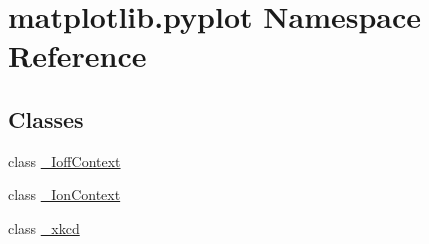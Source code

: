 \hypertarget{namespacematplotlib_1_1pyplot}{}\section{matplotlib.\+pyplot Namespace Reference}
\label{namespacematplotlib_1_1pyplot}
\subsection*{Classes}
\begin{DoxyCompactItemize}
\item 
class \hyperlink{classmatplotlib_1_1pyplot_1_1__IoffContext}{\+\_\+\+Ioff\+Context}
\item 
class \hyperlink{classmatplotlib_1_1pyplot_1_1__IonContext}{\+\_\+\+Ion\+Context}
\item 
class \hyperlink{classmatplotlib_1_1pyplot_1_1__xkcd}{\+\_\+xkcd}
\end{DoxyCompactItemize}
